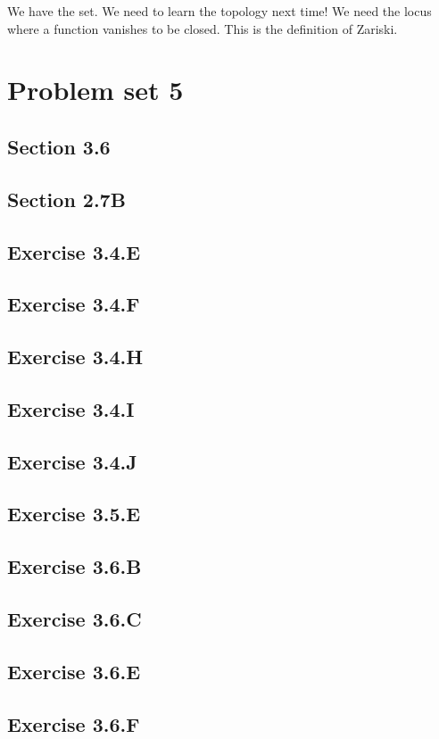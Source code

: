 \documentclass{book}
\theoremstyle{definition}
\begin{document}
We have the set. We need to learn the topology next time! We need the
locus where a function vanishes to be closed. This is the definition of Zariski.

\chapter{Problem set 5}

\section{Section 3.6}
\section{Section 2.7B}
\section{Exercise 3.4.E}
\section{Exercise 3.4.F}
\section{Exercise 3.4.H}
\section{Exercise 3.4.I}
\section{Exercise 3.4.J}
\section{Exercise 3.5.E}
\section{Exercise 3.6.B}
\section{Exercise 3.6.C}
\section{Exercise 3.6.E}
\section{Exercise 3.6.F}
\end{document}
